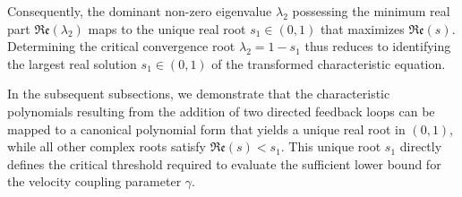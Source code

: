 Consequently, the dominant non-zero eigenvalue $\lambda_2$ possessing the minimum real part $\mathfrak{Re}(\lambda_2)$ maps to the unique real root $s_1 \in (0, 1)$ that maximizes $\mathfrak{Re}(s)$. Determining the critical convergence root $\lambda_2 = 1 - s_1$ thus reduces to identifying the largest real solution $s_1 \in (0, 1)$ of the transformed characteristic equation. 

In the subsequent subsections, we demonstrate that the characteristic polynomials resulting from the addition of two directed feedback loops can be mapped to a canonical polynomial form that yields a unique real root in $(0, 1)$, while all other complex roots satisfy $\mathfrak{Re}(s) < s_1$. This unique root $s_1$ directly defines the critical threshold required to evaluate the sufficient lower bound for the velocity coupling parameter $\gamma$.

